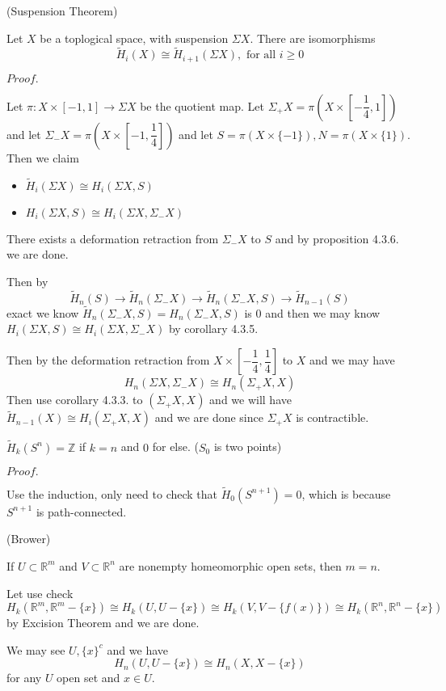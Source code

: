 \documentclass{article}
\newcommand{\Pf}[1]{$Proof.$\par}
\begin{document}
\begin{theorem}(Suspension Theorem)\par
    Let $X$ be a toplogical space, with suspension $\Sigma X$. There are isomorphisms
    \[\widetilde{H}_i(X) \cong \widetilde{H}_{i+1}(\Sigma X), \text{ for all }i\geq 0\]
\end{theorem}
\Pf\par
    Let $\pi:X\times [-1,1] \to \Sigma X$ be the quotient map. Let $\Sigma_+ X = \pi(X\times[-\dfrac{1}{4},1])$ and let $\Sigma_-X = \pi(X\times[-1,\dfrac{1}{4}])$ and let $S = \pi(X\times \{-1\}), N = \pi(X\times\{1\})$. Then we claim
    \begin{itemize}
        \item $\widetilde{H}_i(\Sigma X) \cong H_i(\Sigma X,S)$
        \item $H_i(\Sigma X,S)\cong H_i(\Sigma X, \Sigma_-X)$
    \end{itemize}
    There exists a deformation retraction from $\Sigma_- X$ to $S$ and by proposition 4.3.6. we are done.\par
    Then by
    \[ \widetilde{H}_n(S) \to \widetilde{H}_n(\Sigma_-X) \to \widetilde{H}_n(\Sigma_-X,S) \to \widetilde{H}_{n-1}(S) \]
    exact we know $\widetilde{H}_n(\Sigma_-X,S) = H_n(\Sigma_-X,S)$ is $0$ and then we may know $H_i(\Sigma X,S)\cong H_i(\Sigma X, \Sigma_-X)$ by corollary 4.3.5.\par
    Then by the deformation retraction from $X\times[-\dfrac{1}{4},\dfrac{1}{4}]$ to $X$ and we may have $$H_n(\Sigma X,\Sigma_-X)\cong H_n(\Sigma_+X,X)$$ Then use corollary 4.3.3. to $(\Sigma_+ X, X)$ and we will have $\widetilde{H}_{n-1}(X) \cong H_i(\Sigma_+X,X)$ and we are done since $\Sigma_+ X$ is contractible.  

\begin{corollary}
    $\widetilde{H}_k(S^n) = \mathbb{Z}$ if $k=n$ and $0$ for else. ($S_0$ is two points) 
\end{corollary}
\Pf\par
    Use the induction, only need to check that $\widetilde{H}_0(S^{n+1}) = 0$, which is because $S^{n+1}$ is path-connected.

\begin{theorem}(Brower)\par
    If $U\subset \mathbb{R}^m$ and $V\subset\mathbb{R}^n$ are nonempty homeomorphic open sets, then $m=n$.
\end{theorem}
    Let use check \[H_k(\mathbb{R}^m,\mathbb{R}^m - \{x\}) \cong H_k(U,U-\{x\}) \cong H_k(V,V-\{f(x)\}) \cong H_k(\mathbb{R}^n,\mathbb{R}^n - \{x\})\]
    by Excision Theorem and we are done.\par
    We may see $U,\{x\}^c$ and we have
    \[H_n(U,U-\{x\}) \cong H_n(X,X-\{x\})\]
    for any $U$ open set and $x\in U$.
\end{document}
